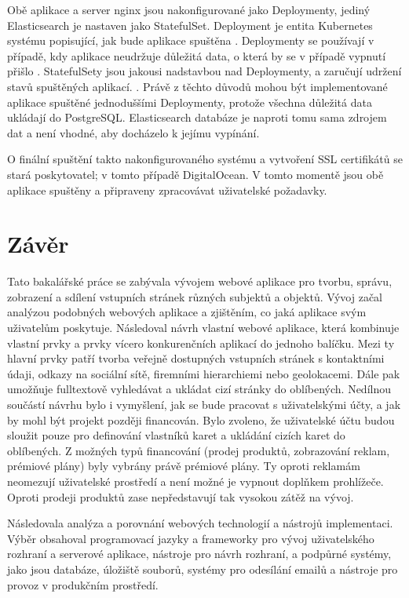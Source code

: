 		Obě aplikace a server nginx jsou nakonfigurované jako Deploymenty, jediný Elasticsearch je nastaven jako StatefulSet.
		Deployment je entita Kubernetes systému popisující, jak bude aplikace spuštěna \cite{deployements}.
		Deploymenty se používají v případě, kdy aplikace neudržuje důležitá data, o která by se v případě vypnutí přišlo
		\cite{deployements}.
		StatefulSety jsou jakousi nadstavbou nad Deploymenty, a zaručují udržení stavů spuštěných aplikací. \cite{statefulsets}.
		Právě z těchto důvodů mohou být implementované aplikace spuštěné jednoduššími Deploymenty, protože všechna důležitá
		data ukládají do PostgreSQL.
		Elasticsearch databáze je naproti tomu sama zdrojem dat a není vhodné, aby docházelo k jejímu vypínání.

		O finální spuštění takto nakonfigurovaného systému a vytvoření SSL certifikátů se stará poskytovatel; v tomto případě DigitalOcean.
		V tomto momentě jsou obě aplikace spuštěny a připraveny zpracovávat uživatelské požadavky.

\section{Závěr}

Tato bakalářské práce se zabývala vývojem webové aplikace pro tvorbu, správu, zobrazení a sdílení vstupních stránek
různých subjektů a objektů.
Vývoj začal analýzou podobných webových aplikace a zjištěním, co jaká aplikace svým uživatelům poskytuje.
Následoval návrh vlastní webové aplikace, která kombinuje vlastní prvky a prvky vícero konkurenčních aplikací do jednoho balíčku.
Mezi ty hlavní prvky patří tvorba veřejně dostupných vstupních stránek s kontaktními údaji, odkazy na sociální sítě, firemními hierarchiemi nebo geolokacemi.
Dále pak umožňuje fulltextově vyhledávat a ukládat cizí stránky do oblíbených.
Nedílnou součástí návrhu bylo i vymyšlení, jak se bude pracovat s uživatelskými účty, a jak by mohl být projekt později
financován.
Bylo zvoleno, že uživatelské účtu budou sloužit pouze pro definování vlastníků karet a ukládání cizích karet do oblíbených.
Z možných typů financování (prodej produktů, zobrazování reklam, prémiové plány) byly vybrány právě prémiové plány.
Ty oproti reklamám neomezují uživatelské prostředí a není možné je vypnout doplňkem prohlížeče.
Oproti prodeji produktů zase nepředstavují tak vysokou zátěž na vývoj.

Následovala analýza a porovnání webových technologií a nástrojů implementaci.
Výběr obsahoval programovací jazyky a frameworky pro vývoj uživatelského rozhraní a serverové aplikace, nástroje pro návrh
rozhraní, a podpůrné systémy, jako jsou databáze, úložiště souborů, systémy pro odesílání emailů a nástroje pro provoz
v produkčním prostředí.

